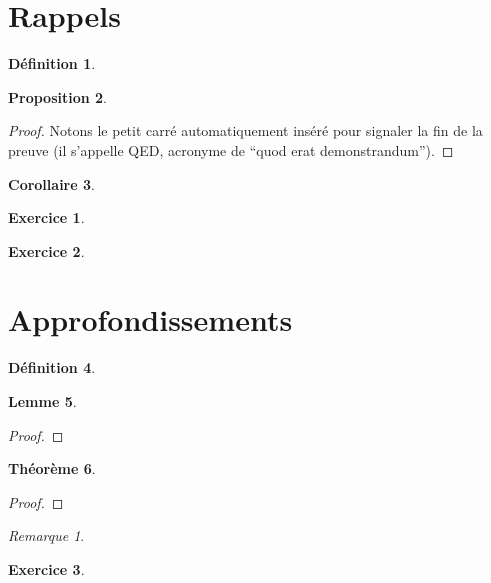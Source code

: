 \documentclass[10pt,a4paper]{scrartcl}
\theoremstyle{plain}
\newtheorem{theoreme}{Théorème}[section]
\newtheorem{proposition}[theoreme]{Proposition}
\newtheorem{corollaire}[theoreme]{Corollaire}
\newtheorem{lemme}[theoreme]{Lemme}
\newtheorem{exo}{Exercice}
\theoremstyle{definition}
\newtheorem{definition}[theoreme]{Définition}
\theoremstyle{remark}
\newtheorem*{remarque}{Remarque}
\begin{document}
\section{Rappels}
\begin{definition}
\lipsum[10][1-2]
\end{definition}
\begin{proposition}
\lipsum[1][1-2]
\end{proposition}
\begin{proof}
\lipsum[1][3-4]
Notons le petit carré automatiquement inséré pour signaler la fin de la preuve (il s'appelle QED, acronyme de ``quod erat demonstrandum'').
\end{proof}
\begin{corollaire}
\lipsum[1][5-6]
\end{corollaire}
\begin{exo}
\lipsum[1][7-8]
\end{exo}
\begin{exo}
\lipsum[1][9-10]
\end{exo}
\section{Approfondissements}
\begin{definition}
\lipsum[2][1-2]
\end{definition}
\begin{lemme}
\lipsum[2][3-4]
\end{lemme}
\begin{proof}
\lipsum[2][5-6]
\end{proof}
\begin{theoreme}
\lipsum[2][7-8]
\end{theoreme}
\begin{proof}
\lipsum[2][9-10]
\end{proof}
\begin{remarque}
\lipsum[2][11-12]
\end{remarque}
\begin{exo}
\lipsum[3][1-2]
\end{exo}
\end{document}
